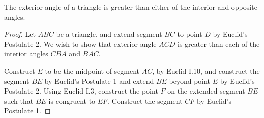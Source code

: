 \begin{euclidtheorem}
The exterior angle of a triangle is greater than either of the interior and opposite angles.
\end{euclidtheorem}
\begin{proof} %
Let $ABC$ be a triangle, and extend segment $BC$ to point $D$ by Euclid's Postulate 2.  We wish to show that exterior angle $ACD$ is greater than each of the interior angles $CBA$ and $BAC$.

Construct $E$ to be the midpoint of segment $AC$, by Euclid I.10, and construct the segment $BE$ by Euclid's Postulate 1 and extend $BE$ beyond point $E$ by Euclid's Postulate 2.  Using Euclid I.3, construct the point $F$ on the extended segment $BE$ such that $BE$ is congruent to $EF$.  Construct the segment $CF$ by Euclid's Postulate 1.


\end{proof}

